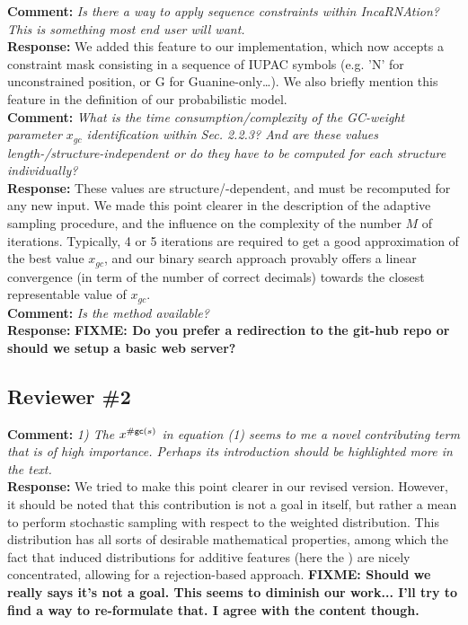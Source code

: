 \documentclass[11pt,hyperref,draft]{article} %
\newcommand{\Answer}[1]{\noindent\textsf{\textbf{Response: }}{\sf#1}\\}
\newcommand{\Comment}[1]{\noindent\textsf{\textbf{Comment: }}{\it#1}\\[.5em]}
\begin{document}
\Comment{Is there a way to apply sequence constraints within IncaRNAtion? This is something most end user will want.
}
\Answer{We added this feature to our implementation, which now accepts a constraint mask consisting in a sequence of IUPAC symbols (e.g. 'N' for unconstrained position, or G for Guanine-only\ldots). We also briefly mention this feature in the definition of our probabilistic model.}

\Comment{What is the time consumption/complexity of the GC-weight parameter $x_{gc}$ identification within Sec. 2.2.3? And are these values length-/structure-independent or do they have to be computed for each structure individually?}
\Answer{These values are structure/\GCContent-dependent, and must be recomputed for any new input. We made this point clearer in the description of the adaptive sampling procedure, and the influence on the complexity of the number $M$ of iterations. Typically, 4 or 5 iterations are required to get a good approximation of the best value $x_{gc}$, and our binary search approach provably offers a linear convergence (in term of the number of correct decimals) towards the closest representable value of $x_{gc}$.}

\Comment{Is the method available?}
\Answer{\textbf{FIXME: Do you prefer a redirection to the git-hub repo or should we setup a basic web server?}}

\subsection{Reviewer \#2}

\Comment{1) The $x^{{\#\text{{\sf gc}}}(s)}$ in equation (1) seems to me a novel contributing term that is of high importance. Perhaps its introduction should be highlighted more in the text.}
\Answer{We tried to make this point clearer in our revised version. However, it should be noted that this contribution is not a goal in itself, but rather a mean to perform stochastic sampling with respect to the weighted distribution. This distribution has all sorts of desirable mathematical properties, among which the fact that induced distributions for additive features (here the \GCContent) are nicely concentrated, allowing for a rejection-based approach.
\textbf{FIXME: Should we really says it's not a goal. This seems to diminish our work... I'll try to find a way to re-formulate that. I agree with the content though.}
}
\end{document}

